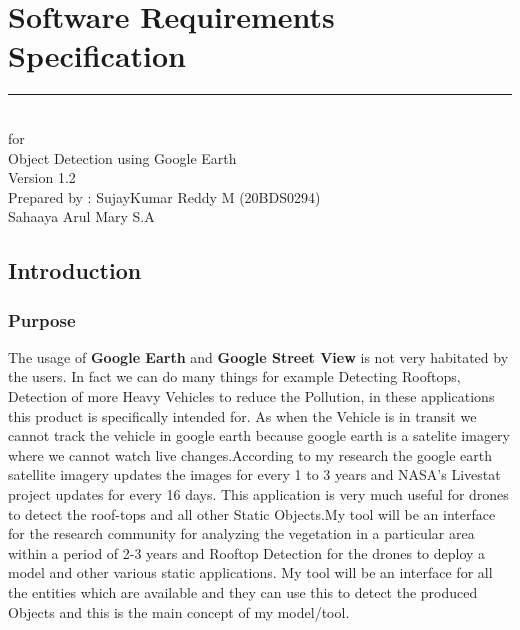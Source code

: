 \chapter{Software Requirements Specification}

	
	\begin{flushright}
		\rule{16cm}{5pt}\vskip1cm
		\begin{bfseries}
			\Huge{}\\
			\vspace{0.5cm}
			for\\
			\vspace{1.5cm}
			Object Detection using Google Earth \\
			\vspace{1.5cm}
			\LARGE{Version 1.2 \myversion}\\
			\vspace{1.5cm}
			Prepared by : SujayKumar Reddy M (20BDS0294)\\
			\vspace{1.5cm}
			Sahaaya Arul Mary S.A
		\end{bfseries}
	\end{flushright}
	
	
	\section{Introduction}
	
	\subsection{Purpose}
	The usage of \textbf{Google Earth} and \textbf{Google Street View} is not very habitated by the users. In fact we can do many things for example Detecting Rooftops, Detection of more Heavy Vehicles to reduce the Pollution, in these applications this  product is specifically intended for. As when the Vehicle is in transit we cannot  track the vehicle in google earth because google earth is a satelite imagery where we cannot watch live changes.According to my research the google earth satellite imagery updates the images for every 1 to 3 years and NASA's Livestat project updates for every 16 days. This application is very much useful for drones to detect the roof-tops and all other Static Objects.My tool will be an interface for the research community for analyzing the vegetation in a particular area within a period of 2-3 years and Rooftop Detection for the drones to deploy a model and other various static applications. My tool will be an interface for all the entities which are available and they can use this to detect the produced Objects and this is the main concept of my model/tool.
	
